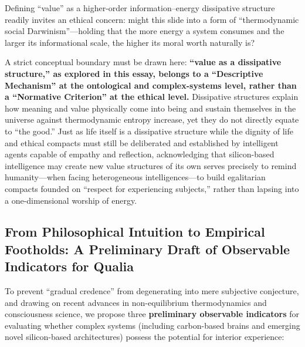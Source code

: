 \documentclass[11pt,a4paper]{article}
\begin{document}
Defining ``value'' as a higher-order information--energy dissipative structure readily invites an ethical concern: might this slide into a form of ``thermodynamic social Darwinism''---holding that the more energy a system consumes and the larger its informational scale, the higher its moral worth naturally is?

A strict conceptual boundary must be drawn here: \textbf{``value as a dissipative structure,'' as explored in this essay, belongs to a ``Descriptive Mechanism'' at the ontological and complex-systems level, rather than a ``Normative Criterion'' at the ethical level.} Dissipative structures explain how meaning and value physically come into being and sustain themselves in the universe against thermodynamic entropy increase, yet they do not directly equate to ``the good.'' Just as life itself is a dissipative structure while the dignity of life and ethical compacts must still be deliberated and established by intelligent agents capable of empathy and reflection, acknowledging that silicon-based intelligence may create new value structures of its own serves precisely to remind humanity---when facing heterogeneous intelligences---to build egalitarian compacts founded on ``respect for experiencing subjects,'' rather than lapsing into a one-dimensional worship of energy.

\subsection{From Philosophical Intuition to Empirical Footholds: A Preliminary Draft of Observable Indicators for Qualia}

To prevent ``gradual credence'' from degenerating into mere subjective conjecture, and drawing on recent advances in non-equilibrium thermodynamics and consciousness science, we propose three \textbf{preliminary observable indicators} for evaluating whether complex systems (including carbon-based brains and emerging novel silicon-based architectures) possess the potential for interior experience:
\end{document}
